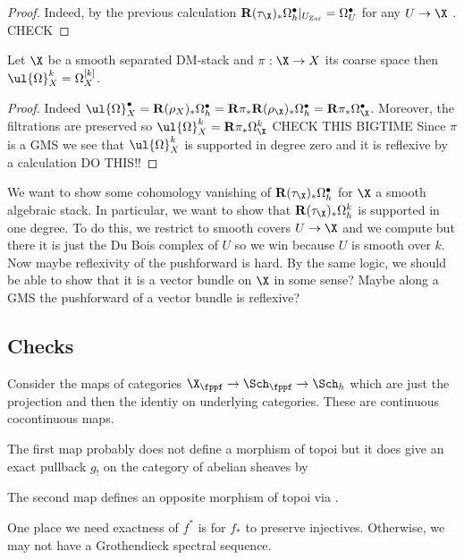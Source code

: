 \documentclass[12pt]{article}
\begin{document}
\begin{proof}
Indeed, by the previous calculation $\R (\tau_{\X})_* \Omega_h^\bullet |_{U_{\Zar}} = \Omega_{U}^\bullet$ for any $U \to \X$ \etale. {\color{red} CHECK}
\end{proof}

\begin{cor}
Let $\X$ be a smooth separated DM-stack and $\pi : \X \to X$ its coarse space then $\ul{\Omega}_X^k = \Omega_X^{[k]}$.
\end{cor}

\begin{proof}
Indeed $\ul{\Omega}_X^\bullet = \R (\rho_X)_* \Omega^\bullet_h = \R \pi_* \R (\rho_{\X})_* \Omega^\bullet_h = \R \pi_* \Omega^\bullet_{\X}$. Moreover, the filtrations are preserved so $\ul{\Omega}_X^k = \R \pi_* \Omega^k_{\X}$ {\color{red} CHECK THIS BIGTIME} Since $\pi$ is a GMS we see that $\ul{\Omega}_X^k$ is supported in degree zero and it is reflexive by a calculation {\color{red} DO THIS!!}
\end{proof}

We want to show some cohomology vanishing of $\R (\tau_\X)_* \Omega_h^\bullet$ for $\X$ a smooth algebraic stack. In particular, we want to show that $\R (\tau_\X)_* \Omega_h^k$ is supported in one degree. To do this, we restrict to smooth covers $U \to \X$ and we compute but there it is just the Du Bois complex of $U$ so we win because $U$ is smooth over $k$. Now maybe reflexivity of the pushforward is hard. By the same logic, we should be able to show that it is a vector bundle on $\X$ in some sense? Maybe along a GMS the pushforward of a vector bundle is reflexive? 

\subsection{Checks}

Consider the maps of categories $\X_{\fppf} \to \Sch_{\fppf} \to \Sch_h$ which are just the projection and then the identiy on underlying categories. These are continuous cocontinuous maps. 

The first map probably does not define a morphism of topoi but it does give an exact pullback $g_!$ on the category of abelian sheaves by 

The second map defines an opposite morphism of topoi via .

\begin{rmk}
One place we need exactness of $f^*$ is for $f_*$ to preserve injectives. Otherwise, we may not have a Grothendieck spectral sequence. 
\end{rmk}
\end{document}
